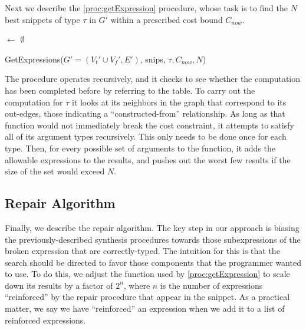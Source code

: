 Next we describe the \ref{proc:getExpression} procedure, whose task is
to find the $N$ best snippets of type $\tau$ in $G'$ within a
prescribed cost bound $C_{now}$.
\begin{procedure}[htb]
\lIf{$\tau$ $\in$ \Keys{\Snips}}{\Return{\Snips$[\tau]$}}
\Results $\leftarrow$ $\emptyset$ \;
\Return{\Results}
\caption{GetExpressions({$G'=(V_t' \cup V_f', E')$}, snips, $\tau, C_{now}, N$)}\label{proc:getExpression}
\end{procedure}
The procedure operates recursively, and it checks to see whether the
computation has been completed before by referring to the \Snips
table. To carry out the computation for $\tau$ it looks at its
neighbors in the graph that correspond to its out-edges, those
indicating a ``constructed-from'' relationship. As long as that
function would not immediately break the cost constraint, it attempts
to satisfy all of its argument types recursively. This only needs to
be done once for each type. Then, for every possible set of arguments
to the function, it adds the allowable expressions to the results, and
pushes out the worst few results if the size of the set would exceed
$N$.

\subsection{Repair Algorithm}
\label{sec:algorithm:repair}
Finally, we describe the repair algorithm. The key step in our
approach is biasing the previously-described synthesis procedures
towards those subexpressions of the broken expression that are
correctly-typed. The intuition for this is that the search should be
directed to favor those components that the programmer wanted to use.
To do this, we adjust the \Cost function used by \ref{proc:getExpression} to 
scale down its results by a factor of $2^n$, where $n$ is the number of
expressions ``reinforced'' by the repair procedure that appear in the
snippet. As a practical matter, we say we have ``reinforced'' an
expression when we add it to a list of reinforced expressions.

